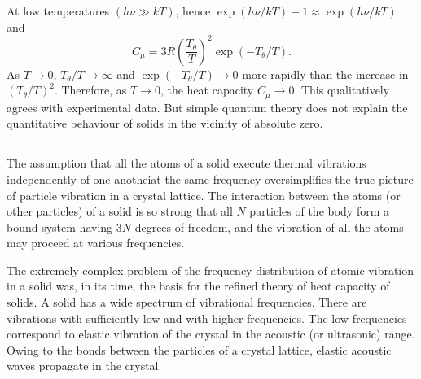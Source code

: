 At low temperatures $(h \nu \gg kT)$, hence $\exp (h \nu /kT) - 1 \approx \exp (h \nu /kT)$ and
\begin{equation*}%
C_{\mu} = 3 R \left( \frac{T_{\theta}}{T} \right)^{2}  \exp (-T_{\theta}/T).
\end{equation*}
As $T \to 0$, $T_{\theta}/T \to \infty$ and $\exp (- T_{\theta}/T) \to 0$ more rapidly than the increase in $(T_{\theta}/T)^{2}$. Therefore, as $T \to 0$, the heat
capacity $C_{\mu} \to 0$. This qualitatively agrees with experimental data. But simple quantum theory does not explain the quantitative behaviour of solids in the vicinity of absolute zero.

\subsection{}\label{41.7.4} The assumption that all the atoms of a solid execute thermal vibrations independently of one anotheiat the same frequency oversimplifies the true picture of particle vibration in a crystal lattice. The interaction between the atoms (or other particles) of a solid is so strong that all $N$ particles of the body form a bound system having $3N$ degrees of freedom, and the vibration of all the atoms may proceed at various frequencies.

The extremely complex problem of the frequency distribution
of atomic vibration in a solid was, in its time, the basis for the refined theory of heat capacity of solids. A solid has a wide spectrum of vibrational frequencies. There are vibrations with sufficiently low and with higher frequencies. The low frequencies correspond to elastic vibration of the crystal in the acoustic (or ultrasonic) range. Owing to the bonds between the particles of a crystal lattice, elastic acoustic waves propagate in the crystal.

